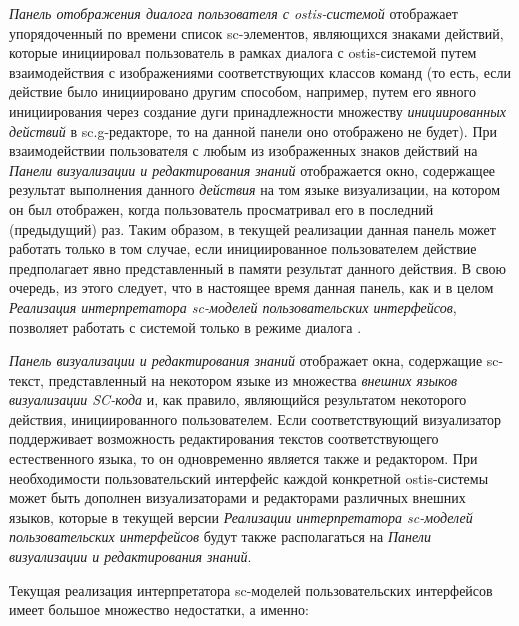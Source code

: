\textit{Панель отображения диалога пользователя с ostis-системой} отображает упорядоченный по времени список sc-элементов,
являющихся знаками действий, которые инициировал пользователь в рамках диалога с ostis-системой путем взаимодействия
с изображениями соответствующих классов команд (то есть, если действие было инициировано другим способом, например,
путем его явного инициирования через создание дуги принадлежности множеству \textit{инициированных действий} в
sc.g-редакторе, то на данной панели оно отображено не будет). При взаимодействии пользователя с любым из изображенных
знаков действий на \textit{Панели визуализации и редактирования знаний} отображается окно, содержащее результат выполнения
данного \textit{действия} на том языке визуализации, на котором он был отображен, когда пользователь просматривал его в
последний (предыдущий) раз. Таким образом, в текущей реализации данная панель может работать только в том случае, если
инициированное пользователем действие предполагает явно представленный в памяти результат данного действия. В свою очередь,
из этого следует, что в настоящее время данная панель, как и в целом \textit{Реализация интерпретатора sc-моделей
пользовательских интерфейсов}, позволяет работать с системой только в режиме диалога .

\textit{Панель визуализации и редактирования знаний} отображает окна, содержащие sc-текст, представленный на
некотором языке из множества \textit{внешних языков визуализации SC-кода} и, как правило, являющийся результатом
некоторого действия, инициированного пользователем. Если соответствующий визуализатор поддерживает возможность
редактирования текстов соответствующего естественного языка, то он одновременно является также и редактором.
При необходимости пользовательский интерфейс каждой конкретной ostis-системы может быть дополнен визуализаторами и
редакторами различных внешних языков, которые в текущей версии \textit{Реализации интерпретатора sc-моделей
пользовательских интерфейсов} будут также располагаться на \textit{Панели визуализации и редактирования знаний}.

Текущая реализация интерпретатора sc-моделей пользовательских интерфейсов имеет большое множество недостатки, а именно:

